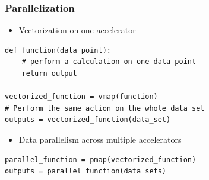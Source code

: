 \begin{frame}[fragile]
    \frametitle{Parallelization}

    \begin{figure}
       \begin{center}
       \end{center}
    \end{figure}
    
\end{frame}



\begin{frame}[fragile]

    \vspace{0.5em}
    \begin{itemize}
        \item Vectorization on one accelerator
    \end{itemize}
    
    \begin{verbatim}
def function(data_point):
    # perform a calculation on one data point
    return output

vectorized_function = vmap(function)  
# Perform the same action on the whole data set
outputs = vectorized_function(data_set)   
    \end{verbatim}

    \vspace{0.5em}
    \vspace{0.5em}
    \begin{itemize}
        \item Data parallelism across multiple accelerators
    \end{itemize}

    \begin{verbatim}
parallel_function = pmap(vectorized_function)  
outputs = parallel_function(data_sets)  
    \end{verbatim}

\end{frame}

